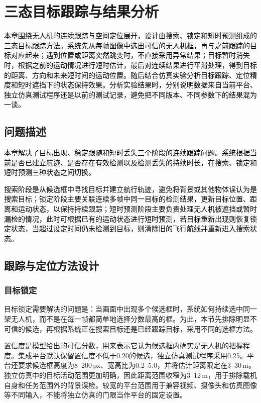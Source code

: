 \chapter{三态目标跟踪与结果分析}
\label{chap:tracking-localization}

\textcolor{black}{本章围绕无人机的连续跟踪与空间定位展开，设计由搜索、锁定和短时预测组成的三态目标跟踪方法。系统先从每帧图像中选出可信的无人机框，再与之前跟踪的目标对应起来；遇到位置或距离突然跳变时，不直接采用异常结果；目标暂时消失时，根据之前的运动情况进行短时估计，最后对连续结果进行平滑处理，得到目标的距离、方向和未来短时间的运动位置。随后结合仿真实验分析目标跟踪、定位精度和短时遮挡下的状态保持效果。分析实验结果时，分别说明数据来自当前平台、独立仿真测试程序还是以前的测试记录，避免把不同版本、不同参数下的结果混为一谈。}

\section{问题描述}

\textcolor{black}{本章解决了目标出现、稳定跟随和短时丢失三个阶段的连续跟踪问题。系统根据当前是否已建立航迹、是否存在有效检测以及检测丢失的持续时长，在搜索、锁定和短时预测三种状态之间切换。}

\textcolor{black}{搜索阶段是从候选框中寻找目标并建立航行轨迹，避免将背景或其他物体误认为是搜索目标；锁定阶段主要关联连续多帧中同一目标的检测结果，更新目标位置、距离和运动状态，以保持持续跟踪；短时预测阶段主要负责处理无人机被遮挡或暂时漏检的情况，此时可根据已有的运动状态进行短时预测，若目标重新出现则恢复锁定状态，当超过设定时间仍未检测到目标，则清除旧的飞行航线并重新进入搜索状态。}

\section{跟踪与定位方法设计}

\subsection{目标锁定}

目标锁定需要解决的问题是：当画面中出现多个候选框时，系统如何持续选中同一架无人机，而不是在每一帧都简单地选择分数最高的框。为此，本节先排除明显不可信的候选，再根据系统正在搜索目标还是已经跟踪目标，采用不同的选框方法。

置信度是模型给出的可信分数，用来表示它认为候选框内确实是无人机的把握程度。集成平台默认保留置信度不低于0.20的候选，独立仿真测试程序采用0.25。平台还要求候选框高度为8--200\,px、宽高比为0.2--5.0，并将估计距离限定在3--30\,m。独立仿真中的目标活动范围更加明确，因此距离范围收窄为3--12\,m，用于排除载机自身和任务范围外的背景误检。较宽的平台范围用于兼容视频、摄像头和仿真图像等不同输入，不能将独立仿真的门限当作平台的固定设置。

